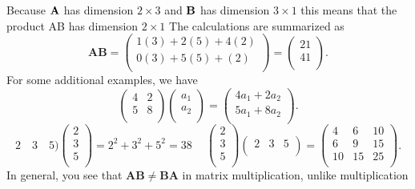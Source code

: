 \documentclass[11pt]{article}
\begin{document}
Because \({\bf A}\) has dimension \(2 \times3\) and \({\bf B}\) has dimension \(3 \times1\) this means that the
 product AB has dimension \(2 \times1\) The calculations are summarized as
\[
\mathbf{A B}=\left( \begin{matrix} {1 ( 3 )+2 ( 5 )+4 ( 2 )} \\ {0 ( 3 )+5 ( 5 )+( 2 )} \\ \end{matrix} \right)=\left( \begin{matrix} {2 1} \\ {4 1} \\ \end{matrix} \right) .
\]
For some additional examples, we have
\[
\left( \begin{matrix} {4} & {2} \\ {5} & {8} \\ \end{matrix} \right) \left( \begin{matrix} {a_{1}} \\ {a_{2}} \\ \end{matrix} \right)=\left( \begin{matrix} {4 a_{1}+2 a_{2}} \\ {5 a_{1}+8 a_{2}} \\ \end{matrix} \right) .
\]
\[
2 \quad3 \quad5 \bigr) \left( \begin{matrix} {2} \\ {3} \\ {5} \\ \end{matrix} \right)=2^{2}+3^{2}+5^{2}=3 8 \quad\ \left( \begin{matrix} {2} \\ {3} \\ {5} \\ \end{matrix} \right) \left( \begin{matrix} {2} & {3} & {5} \\ \end{matrix} \right)=\left( \begin{matrix} {4} & {6} & {1 0} \\ {6} & {9} & {1 5} \\ {1 0} & {1 5} & {2 5} \\ \end{matrix} \right) .
\]
In general, you see that \(\mathbf{A B} \neq\mathbf{B} \mathbf{A}\) in matrix multiplication, unlike multiplication
\end{document}
